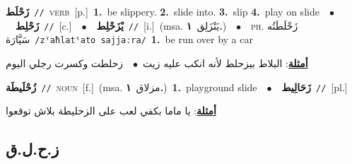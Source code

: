 \documentclass[10pt,a4paper,twoside]{article} %
\begin{document}
\begin{multicols}{2}
{\setlength\topsep{0pt}\textbf{\foreignlanguage{arabic}{زَحْلَط}}\ {\color{gray}\texttt{//}\color{black}}\ \textsc{verb}\ [p.]\ \textbf{1.}~be slippery.  \textbf{2.}~slide into.  \textbf{3.}~slip  \textbf{4.}~play on slide\ \ $\bullet$\ \ \setlength\topsep{0pt}\textbf{\foreignlanguage{arabic}{زَحْلِط}}\ {\color{gray}\texttt{//}\color{black}}\ [c.]\ \ $\bullet$\ \ \setlength\topsep{0pt}\textbf{\foreignlanguage{arabic}{يْزَحْلِط}}\ {\color{gray}\texttt{//}\color{black}}\ [i.]\ \color{gray}(msa. \foreignlanguage{arabic}{يَنْزَلِق}~\foreignlanguage{arabic}{\textbf{١.}})\color{black}\ \ $\bullet$\ \ \textsc{ph.} \color{gray} \foreignlanguage{arabic}{زَحْلَطَتُه سَيَّارَة}\color{black}\ {\color{gray}\texttt{/{\sffamily zˤaħlatˤato sajjaːra}/}\color{black}}\ \textbf{1.}~be run over by a car\  \begin{flushright}\color{gray}\foreignlanguage{arabic}{\textbf{\underline{\foreignlanguage{arabic}{أمثلة}}}: البلاط بيزحلط لأنه انكب عليه زيت\ $\bullet$\ \  زحلطت وكسرت رجلي اليوم}\end{flushright}\color{black}} \vspace{2mm}

{\setlength\topsep{0pt}\textbf{\foreignlanguage{arabic}{زُحْلَيطَة}}\ {\color{gray}\texttt{//}\color{black}}\ \textsc{noun}\ [f.]\ \color{gray}(msa. \foreignlanguage{arabic}{مزلاق}~\foreignlanguage{arabic}{\textbf{١.}})\color{black}\ \textbf{1.}~playground slide\ \ $\bullet$\ \ \setlength\topsep{0pt}\textbf{\foreignlanguage{arabic}{زَحَالِيط}}\ {\color{gray}\texttt{//}\color{black}}\ [pl.]\  \begin{flushright}\color{gray}\foreignlanguage{arabic}{\textbf{\underline{\foreignlanguage{arabic}{أمثلة}}}: يا ماما بكفي لعب على الزحليطة بلاش توقعوا}\end{flushright}\color{black}} \vspace{2mm}

\vspace{-3mm}
\subsection*{\color{blue}\foreignlanguage{arabic}{ز.ح.ل.ق}\color{blue}{}} 


\end{multicols}
\end{document}
